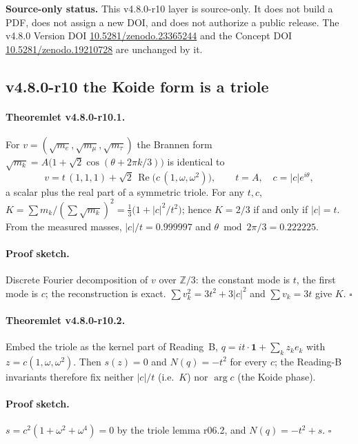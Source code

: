 \noindent\textbf{Source-only status.}
This v4.8.0-r10 layer is source-only.  It does not build a PDF, does not assign a new DOI,
and does not authorize a public release.  The v4.8.0 Version DOI
\href{https://doi.org/10.5281/zenodo.23365244}{10.5281/zenodo.23365244} and the Concept DOI
\href{https://doi.org/10.5281/zenodo.19210728}{10.5281/zenodo.19210728} are unchanged by it.

\subsection*{v4.8.0-r10 the Koide form is a triole}
\label{subsec:v480-r10-koide-triole}

\paragraph{Theoremlet v4.8.0-r10.1.}
For \(v=(\sqrt{m_e},\sqrt{m_\mu},\sqrt{m_\tau})\) the Brannen form
\(\sqrt{m_k}=A\bigl(1+\sqrt2\cos(\theta+2\pi k/3)\bigr)\) is identical to
\[
v=t\,(1,1,1)+\sqrt2\,\operatorname{Re}\bigl(c\,(1,\omega,\omega^2)\bigr),\qquad
t=A,\quad c=|c|e^{i\theta},
\]
a scalar plus the real part of a symmetric triole.  For any \(t,c\),
\(K=\sum m_k/(\sum\sqrt{m_k})^2=\tfrac13\bigl(1+|c|^2/t^2\bigr)\); hence \(K=2/3\) if and only if
\(|c|=t\).  From the measured masses, \(|c|/t=0.999997\) and \(\theta\bmod 2\pi/3=0.222225\).

\paragraph{Proof sketch.}
Discrete Fourier decomposition of \(v\) over \(\mathbb Z/3\): the constant mode is \(t\), the first mode
is \(c\); the reconstruction is exact.  \(\sum v_k^2=3t^2+3|c|^2\) and \(\sum v_k=3t\) give \(K\).
\(\square\)

\paragraph{Theoremlet v4.8.0-r10.2.}
Embed the triole as the kernel part of Reading~B, \(q=it\cdot\mathbf 1+\sum_k z_ke_k\) with
\(z=c(1,\omega,\omega^2)\).  Then \(s(z)=0\) and \(N(q)=-t^2\) for every \(c\); the Reading-B invariants
therefore fix neither \(|c|/t\) (i.e.\ \(K\)) nor \(\arg c\) (the Koide phase).

\paragraph{Proof sketch.}
\(s=c^2(1+\omega^2+\omega^4)=0\) by the triole lemma r06.2, and \(N(q)=-t^2+s\).  \(\square\)

